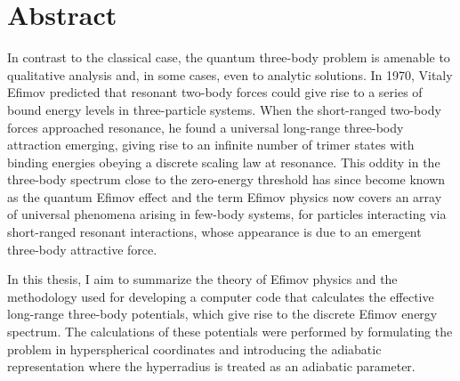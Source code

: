 \documentclass[a4paper,11pt]{book}
\begin{document}
 
\frontmatter

\begin{titlepage}
	
\end{titlepage}

\chapter*{Abstract}
In contrast to the classical case, the quantum three-body problem is amenable to qualitative analysis and, in some cases, even to analytic solutions. In 1970, Vitaly Efimov predicted that resonant two-body forces could give rise to a series of bound energy levels in three-particle systems. When the short-ranged two-body forces approached resonance, he found a universal long-range three-body attraction emerging, giving rise to an infinite number of trimer states with binding energies obeying a discrete scaling law at resonance. This oddity in the three-body spectrum close to the zero-energy threshold has since become known as the quantum Efimov effect and the term Efimov physics now covers an array of universal phenomena arising in few-body systems, for particles interacting via short-ranged resonant interactions, whose appearance is due to an emergent three-body attractive force. 

In this thesis, I aim to summarize the theory of Efimov physics and the methodology used for developing a computer code that calculates the effective long-range three-body potentials, which give rise to the discrete Efimov energy spectrum. The calculations of these potentials were performed by formulating the problem in hyperspherical coordinates and introducing the adiabatic representation where the hyperradius is treated as an adiabatic parameter. 
\end{document}
